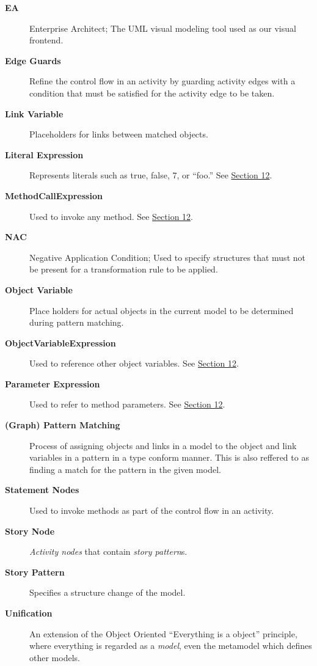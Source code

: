 \begin{description}
\item[\bf EA]
Enterprise Architect; The UML visual modeling tool used as our visual frontend.

\item[\bf Edge Guards]
Refine the control flow in an activity by guarding activity edges with a condition that must be satisfied for the activity edge to be taken.

\item[\bf Link Variable]
Placeholders for links between matched objects.

\item[\bf Literal Expression]
Represents literals such as true, false, 7, or ``foo.'' See \hyperlink{expressionReview}{Section 12}.

\item[\bf MethodCallExpression]
Used to invoke any method. See \hyperlink{expressionReview}{Section 12}.

\item[\bf NAC]
Negative Application Condition; Used to specify structures that must not be present for a transformation rule to be applied.
	
\item[\bf Object Variable]
Place holders for actual objects in the current model to be determined during pattern matching.

\item[\bf ObjectVariableExpression]
Used to reference other object variables. See \hyperlink{expressionReview}{Section 12}.

\item[\bf Parameter Expression]
Used to refer to method parameters. See \hyperlink{expressionReview}{Section 12}.

\item[\bf (Graph) Pattern Matching]
Process of assigning objects and links in a model to the object and link variables in a pattern in a type conform manner. This is also reffered to as finding a
match for the pattern in the given model.

\item[\bf Statement Nodes]
Used to invoke methods as part of the control flow in an activity.

\item[\bf Story Node]
\emph{Activity nodes} that contain \emph{story pattern}s.

\item[\bf Story Pattern]
Specifies a structure change of the model.

\item[\bf Unification]
An extension of the Object Oriented ``Everything is a object'' principle, where everything is regarded as a \emph{model}, even the metamodel which defines
other models.

\end{description}

